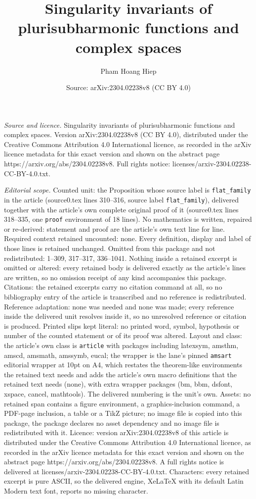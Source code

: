 \documentclass[10pt,a4paper]{amsart}
\title[Singularity invariants of plurisubharmonic functions and com]{Singularity invariants of plurisubharmonic functions and complex spaces}
\author{Pham Hoang Hiep}
\date{Source: arXiv:2304.02238v8 (CC BY 4.0)}
\begin{document}
\maketitle

\noindent\emph{Source and licence.} Singularity invariants of plurisubharmonic functions and complex spaces. Version arXiv:2304.02238v8 (CC BY 4.0), distributed under the Creative Commons Attribution 4.0 International licence, as recorded in the arXiv licence metadata for this exact version and shown on the abstract page https://arxiv.org/abs/2304.02238v8. Full rights notice: licenses/arxiv-2304.02238-CC-BY-4.0.txt.\par\smallskip

\noindent\textit{Editorial scope.} Counted unit: the Proposition whose source label is \texttt{flat\_family} in the article (source0.tex lines 310--316, source label \texttt{flat\_family}), delivered together with the article's own complete original proof of it (source0.tex lines 318--335, one \texttt{proof} environment of 18 lines). No mathematics is written, repaired or re-derived: statement and proof are the article's own text line for line. Required context retained uncounted: none. Every definition, display and label of those lines is retained unchanged. Omitted from this package and not redistributed: 1--309, 317--317, 336--1041. Nothing inside a retained excerpt is omitted or altered: every retained body is delivered exactly as the article's lines are written, so no omission receipt of any kind accompanies this package. Citations: the retained excerpts carry no citation command at all, so no bibliography entry of the article is transcribed and no reference is redistributed. Reference adaptation: none was needed and none was made; every reference inside the delivered unit resolves inside it, so no unresolved reference or citation is produced. Printed slips kept literal: no printed word, symbol, hypothesis or number of the counted statement or of its proof was altered. Layout and class: the article's own class is \texttt{article} with packages including latexsym, amsthm, amscd, amsmath, amssymb, eucal; the wrapper is the lane's pinned \texttt{amsart} editorial wrapper at 10pt on A4, which restates the theorem-like environments the retained text needs and adds the article's own macro definitions that the retained text needs (none), with extra wrapper packages (bm, bbm, dsfont, xspace, cancel, mathtools). The delivered numbering is the unit's own. Assets: no retained span contains a figure environment, a graphics-inclusion command, a PDF-page inclusion, a table or a TikZ picture; no image file is copied into this package, the package declares no asset dependency and no image file is redistributed with it. Licence: version arXiv:2304.02238v8 of this article is distributed under the Creative Commons Attribution 4.0 International licence, as recorded in the arXiv licence metadata for this exact version and shown on the abstract page https://arxiv.org/abs/2304.02238v8. A full rights notice is delivered at licenses/arxiv-2304.02238-CC-BY-4.0.txt. Characters: every retained excerpt is pure ASCII, so the delivered engine, XeLaTeX with its default Latin Modern text font, reports no missing character.
\end{document}
